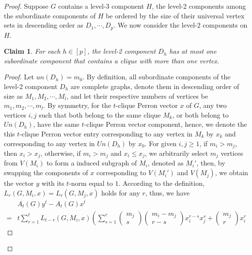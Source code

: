 \documentclass[preprint,12pt]{elsarticle}
\newtheorem{claim}{Claim}[thm]
\begin{document}
        \begin{proof}

                Suppose $G$ contains a level-3 component $H$, the level-2 components among the subordinate components of $H$ be ordered by the size of their universal vertex sets in descending order as $D_1, \cdots, D_p$. We now consider the level-2 components on $H$.
            \begin{claim}\label{CC1}
                For each $h \in [p]$, the level-2 component $D_h$ has at most one subordinate component that contains a clique with more than one vertex.
            \end{claim}
            \begin{proof}
                Let $un(D_h) = m_0$. By definition, all subordinate components of the level-2 component $D_h$ are complete graphs, denote them in descending order of size as $M_1, M_2, \cdots, M_l$, and let their respective numbers of vertices be $m_1, m_2, \cdots, m_l$.
                By symmetry, for the $t$-clique Perron vector $x$ of $G$, any two vertices $i, j$ such that both belong to the same clique $M_k$, or both belong to $Un(D_h)$, have the same $t$-clique Perron vector component, hence, we denote the this $t$-clique Perron vector entry corresponding to any vertex in $M_k$ by $x_k$ and corresponding to any vertex in $Un(D_h)$ by $x_0$.
                For given $i, j \geq 1$, if $m_i > m_j$, then $x_i > x_j$, otherwise, if $m_i > m_j$ and $x_i \leq x_j$, we arbitrarily select $m_j$ vertices from $V(M_i)$ to form a induced subgraph of $M_i$, denoted as $M_i'$, then, by swapping the components of $x$ corresponding to $V(M_i')$ and $V(M_j)$, we obtain the vector $y$ with its $t$-norm equal to $1$. According to the definition, $L_r( G , M_i, x)=L_r( G ,M_j, x)$ holds for any $r$, thus, we have
                    \begin{align*}
                        &A_t(G)y^t-A_t(G)x^t
                        \\= &t\sum_{r=1}^t L_{t-r}(G, M_i, x) \left( \sum_{s=1}^r \begin{pmatrix} m_j\\s \end{pmatrix} \begin{pmatrix}m_i-m_j\\ r-s \end{pmatrix} x_i^{r-s}x_j^{s} + \begin{pmatrix}m_j\\r\end{pmatrix} x_i^r \right.

\end{align*}
\end{proof}
\end{proof}
\end{document}
